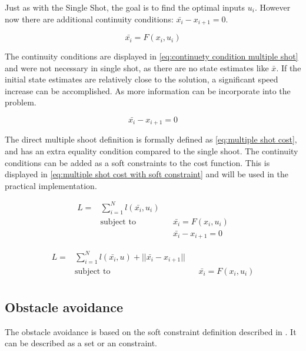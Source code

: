 			Just as with the Single Shot, the goal is to find the optimal inputs $u_i$. However now there are additional continuity conditions: $\bar{x_i} - x_{i+1} = 0$.
			
			\begin{equation}
				\bar{x_i} = F(x_i,u_i)
				\label{eq:}
			\end{equation}
			
			The continuity conditions are displayed in \eqref{eq:continuety condition multiple shot} and were not necessary in single shot, as there are no state estimates like $\bar{x}$. If the initial state estimates are relatively close to the solution, a significant speed increase can be accomplished. As more information can be incorporate into the problem.
			
			\begin{equation}
				\bar{x_i} - x_{i+1} = 0
				\label{eq:continuety condition multiple shot}
			\end{equation}
			
			The direct multiple shoot definition is formally defined as \eqref{eq:multiple shot cost}, and has an extra equality condition compared to the single shoot. The continuity conditions can be added as a soft constraints to the cost function. This is displayed in \eqref{eq:multiple shot cost with soft constraint} and will be used in the practical implementation.
			
			\begin{equation}
				\begin{aligned}
				L =  & \sum_{i=1}^{N} l(\bar{x_i},u_i) \\
				& \text{subject to}			&& \bar{x_i} = F(x_i,u_i) \\
				& 							&& \bar{x_i} - x_{i+1} = 0
				\end{aligned}
				\label{eq:multiple shot cost}
			\end{equation}
			
			\begin{equation}
			\begin{aligned}
			L =  & \sum_{i=1}^{N} l(\bar{x_i},u) + ||\bar{x_i} - x_{i+1}||\\
			& \text{subject to}			&& \bar{x_i} = F(x_i,u_i) \\
			\end{aligned}
			\label{eq:multiple shot cost with soft constraint}
			\end{equation}
			
		\subsection{Obstacle avoidance}
			The obstacle avoidance is based on the soft constraint definition described in \cite{AjaySathya2017}. It can be described as a set or an constraint.
